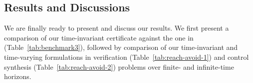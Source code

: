 \documentclass[journal,twoside,web]{ieeecolor}
\theoremstyle{definition}
\theoremstyle{plain}
\theoremstyle{plain}
\begin{document}
\subsection{Results and Discussions}
{We are finally ready to present and discuss our results. We first present a comparison of our time-invariant certificate against the one in \cite{vzikelic2023learning} (Table~\ref{tab:benchmark3}), followed by comparison of our time-invariant and time-varying formulations in verification (Table~\ref{tab:reach-avoid-1}) and control synthesis (Table~\ref{tab:reach-avoid-2}) problems over finite- and infinite-time horizons.}
\end{document}
